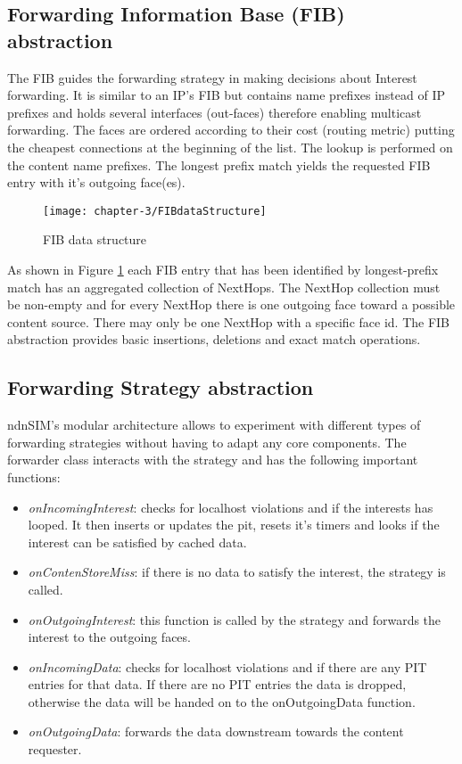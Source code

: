 \subsection{Forwarding Information Base (FIB) abstraction}

The FIB guides the forwarding strategy in making decisions about Interest forwarding. It is similar to an IP's FIB but contains name prefixes instead of IP prefixes and holds several interfaces (out-faces) therefore enabling multicast forwarding. The faces are ordered according to their cost (routing metric) putting the cheapest connections at the beginning of the list. The lookup is performed on the content name prefixes. The longest prefix match yields the requested FIB entry with it's outgoing face(es).

\begin{figure}[H]
  \centering
  \texttt{[image: chapter-3/FIBdataStructure]}
  \caption{FIB data structure}
  \label{fig:FIBdataStructure}
\end{figure}

As shown in Figure \ref{fig:FIBdataStructure} each FIB entry that has been identified by longest-prefix match has an aggregated collection of NextHops. The NextHop collection must be non-empty and for every NextHop there is one outgoing face toward a possible content source. There may only be one NextHop with a specific face id. The FIB abstraction provides basic insertions, deletions and exact match operations.

\subsection{Forwarding Strategy abstraction}

ndnSIM's modular architecture allows to experiment with different types of forwarding strategies without having to adapt any core components. The forwarder class interacts with the strategy and has the following important functions:

\begin{itemize}
\item \emph{onIncomingInterest}: checks for localhost violations and if the interests has looped. It then inserts or updates the pit, resets it's timers and looks if the interest can be satisfied by cached data.
\item \emph{onContenStoreMiss}: if there is no data to satisfy the interest, the strategy is called.
\item \emph{onOutgoingInterest}: this function is called by the strategy and forwards the interest to the outgoing faces.
\item \emph{onIncomingData}: checks for localhost violations and if there are any PIT entries for that data. If there are no PIT entries the data is dropped, otherwise the data will be handed on to the onOutgoingData function.
\item \emph{onOutgoingData}: forwards the data downstream towards the content requester.
\end{itemize}


